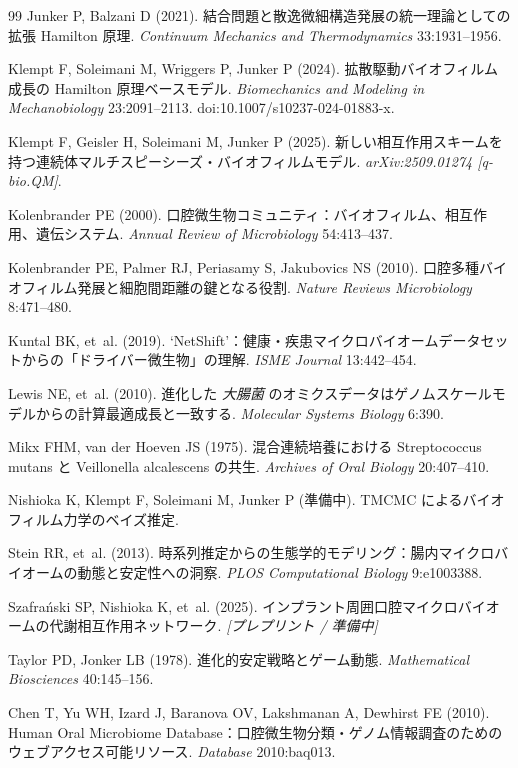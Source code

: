 \documentclass[11pt,a4paper]{article}
\begin{document}
\begin{thebibliography}{99}
Junker P, Balzani D (2021). 結合問題と散逸微細構造発展の統一理論としての拡張 Hamilton 原理.
\textit{Continuum Mechanics and Thermodynamics} 33:1931--1956.

Klempt F, Soleimani M, Wriggers P, Junker P (2024).
拡散駆動バイオフィルム成長の Hamilton 原理ベースモデル.
\textit{Biomechanics and Modeling in Mechanobiology} 23:2091--2113. doi:10.1007/s10237-024-01883-x.

Klempt F, Geisler H, Soleimani M, Junker P (2025). 新しい相互作用スキームを持つ連続体マルチスピーシーズ・バイオフィルムモデル. \textit{arXiv:2509.01274 [q-bio.QM]}.

Kolenbrander PE (2000). 口腔微生物コミュニティ：バイオフィルム、相互作用、遺伝システム.
\textit{Annual Review of Microbiology} 54:413--437.

Kolenbrander PE, Palmer RJ, Periasamy S, Jakubovics NS (2010).
口腔多種バイオフィルム発展と細胞間距離の鍵となる役割.
\textit{Nature Reviews Microbiology} 8:471--480.

Kuntal BK, et~al. (2019). `NetShift'：健康・疾患マイクロバイオームデータセットからの「ドライバー微生物」の理解.
\textit{ISME Journal} 13:442--454.

Lewis NE, et~al. (2010). 進化した \textit{大腸菌} のオミクスデータはゲノムスケールモデルからの計算最適成長と一致する.
\textit{Molecular Systems Biology} 6:390.

Mikx FHM, van der Hoeven JS (1975). 混合連続培養における Streptococcus mutans と Veillonella alcalescens の共生.
\textit{Archives of Oral Biology} 20:407--410.

Nishioka K, Klempt F, Soleimani M, Junker P (準備中).
TMCMC によるバイオフィルム力学のベイズ推定.

Stein RR, et~al. (2013). 時系列推定からの生態学的モデリング：腸内マイクロバイオームの動態と安定性への洞察.
\textit{PLOS Computational Biology} 9:e1003388.

Szafra\'{n}ski SP, Nishioka K, et~al. (2025). インプラント周囲口腔マイクロバイオームの代謝相互作用ネットワーク. \textit{[プレプリント / 準備中]}

Taylor PD, Jonker LB (1978). 進化的安定戦略とゲーム動態.
\textit{Mathematical Biosciences} 40:145--156.

Chen T, Yu WH, Izard J, Baranova OV, Lakshmanan A, Dewhirst FE (2010).
Human Oral Microbiome Database：口腔微生物分類・ゲノム情報調査のためのウェブアクセス可能リソース.
\textit{Database} 2010:baq013.

\end{thebibliography}
\end{document}
